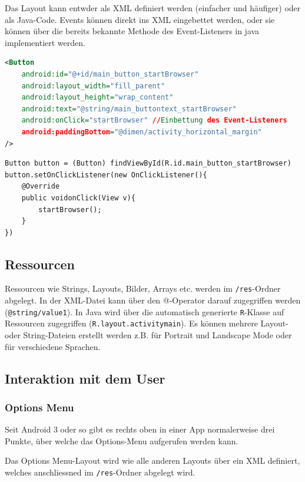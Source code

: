 \documentclass[a4paper, 11pt]{article}
\newcommand{\code}[1]{\texttt{#1}}
\begin{document}
\noindent Das Layout kann entwder als XML definiert werden (einfacher und häufiger) oder als Java-Code. Events können direkt ins XML eingebettet werden, oder sie können über die bereits bekannte Methode des Event-Listeners in java implementiert werden.

\begin{lstlisting}[language=xml, captionpos=b, caption={Button-Definition in XML}]
<Button
	android:id="@+id/main_button_startBrowser"
	android:layout_width="fill_parent"
	android:layout_height="wrap_content"
	android:text="@string/main_buttontext_startBrowser"
	android:onClick="startBrowser" //Einbettung des Event-Listeners
	android:paddingBottom="@dimen/activity_horizontal_margin"
/>
\end{lstlisting}

\begin{lstlisting}[captionpos=b, caption={Button Event-Definition in Java}]
Button button = (Button) findViewById(R.id.main_button_startBrowser)
button.setOnClickListener(new OnClickListener(){
	@Override
	public voidonClick(View v){
		startBrowser();
	}
})
\end{lstlisting}

\subsection{Ressourcen}
Ressourcen wie Strings, Layouts, Bilder, Arrays etc. werden im \code{/res}-Ordner abgelegt. In der XML-Datei kann über den @-Operator darauf zugegriffen werden (\code{@string/value1}). In Java wird über die automatisch generierte \code{R}-Klasse auf Ressourcen zugegriffen (\code{R.layout.activity\textunderscore main}). Es können mehrere Layout- oder String-Dateien erstellt werden z.B. für Portrait und Landscape Mode oder für verschiedene Sprachen.

\subsection{Interaktion mit dem User}
\subsubsection{Options Menu}
Seit Android 3 oder so gibt es rechts oben in einer App normalerweise drei Punkte, über welche das Options-Menu aufgerufen werden kann. 

Das Options Menu-Layout wird wie alle anderen Layouts über ein XML definiert, welches anschliessned im \code{/res}-Ordner abgelegt wird. 
\end{document}
